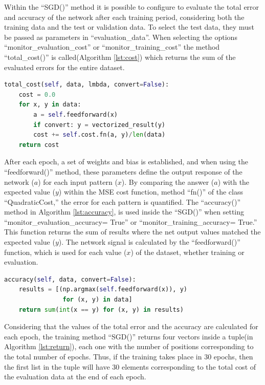 Within the “SGD()” method it is possible to configure to evaluate the total error and accuracy of the network after each training period, considering both the training data and the test or validation data. To select the test data, they must be passed as parameters in “evaluation\_data”. When selecting the options “monitor\_evaluation\_cost” or “monitor\_training\_cost” the method “total\_cost()” is called(Algorithm \ref{lst:cost}) which returns the sum of the evaluated errors for the entire dataset.

\begin{lstlisting}[caption={total\_cost() method in Python},label={lst:cost},language=Python]
total_cost(self, data, lmbda, convert=False):
    cost = 0.0
    for x, y in data:
        a = self.feedforward(x)
        if convert: y = vectorized_result(y)
        cost += self.cost.fn(a, y)/len(data)
    return cost
\end{lstlisting}

After each epoch, a set of weights and bias is established, and when using the “feedforward()” method, these parameters define the output response of the network ($a$) for each input pattern ($x$). By comparing the answer ($a$) with the expected value ($y$) within the MSE cost function, method “fn()” of the class “QuadraticCost,” the error for each pattern is quantified. The “accuracy()” method in Algorithm \ref{lst:accuracy}, is used inside the “SGD()” when setting “monitor\_evaluation\_accuracy= True” or “monitor\_training\_accuracy= True.” This function returns the sum of results where the net output values matched the expected value ($y$). The network signal is calculated by the “feedforward()” function, which is used for each value ($x$) of the dataset, whether training or evaluation.

\begin{lstlisting}[caption={accuracy() method in Python},label={lst:accuracy},language=Python]
accuracy(self, data, convert=False):
    results = [(np.argmax(self.feedforward(x)), y) 
                for (x, y) in data]
    return sum(int(x == y) for (x, y) in results)
\end{lstlisting}

Considering that the values of the total error and the accuracy are calculated for each epoch, the training method “SGD()” returns four vectors inside a tuple(in Algorithm \ref{lst:return}), each one with the number of positions corresponding to the total number of epochs. Thus, if the training takes place in 30 epochs, then the first list in the tuple will have 30 elements corresponding to the total cost of the evaluation data at the end of each epoch.

